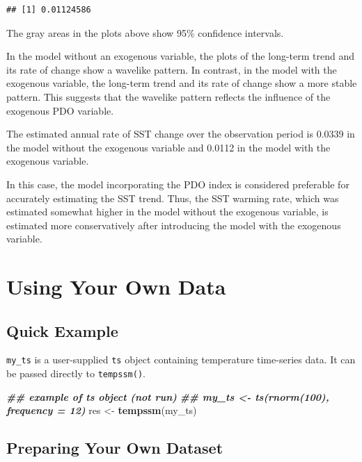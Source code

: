 \documentclass[
]{article}
\newenvironment{Shaded}{\begin{snugshade}}{\end{snugshade}}
\newcommand{\DocumentationTok}[1]{\textcolor[rgb]{0.56,0.35,0.01}{\textbf{\textit{#1}}}}
\newcommand{\FunctionTok}[1]{\textcolor[rgb]{0.13,0.29,0.53}{\textbf{#1}}}
\newcommand{\NormalTok}[1]{#1}
\newcommand{\OtherTok}[1]{\textcolor[rgb]{0.56,0.35,0.01}{#1}}
\begin{document}
\begin{verbatim}
## [1] 0.01124586
\end{verbatim}

The gray areas in the plots above show 95\% confidence intervals.

In the model without an exogenous variable, the plots of the long-term
trend and its rate of change show a wavelike pattern. In contrast, in
the model with the exogenous variable, the long-term trend and its rate
of change show a more stable pattern. This suggests that the wavelike
pattern reflects the influence of the exogenous PDO variable.

The estimated annual rate of SST change over the observation period is
0.0339 in the model without the exogenous variable and 0.0112 in the
model with the exogenous variable.

In this case, the model incorporating the PDO index is considered
preferable for accurately estimating the SST trend. Thus, the SST
warming rate, which was estimated somewhat higher in the model without
the exogenous variable, is estimated more conservatively after
introducing the model with the exogenous variable.

\section{Using Your Own Data}\label{using-your-own-data}

\subsection{Quick Example}\label{quick-example}

\texttt{my\_ts} is a user-supplied \texttt{ts} object containing
temperature time-series data. It can be passed directly to
\texttt{tempssm()}.

\begin{Shaded}
\begin{Highlighting}[]
\DocumentationTok{\#\# example of ts object (not run)}
\DocumentationTok{\#\# my\_ts \textless{}{-} ts(rnorm(100), frequency = 12)}
\NormalTok{res }\OtherTok{\textless{}{-}} \FunctionTok{tempssm}\NormalTok{(my\_ts)}
\end{Highlighting}
\end{Shaded}

\subsection{Preparing Your Own
Dataset}\label{preparing-your-own-dataset}
\end{document}
